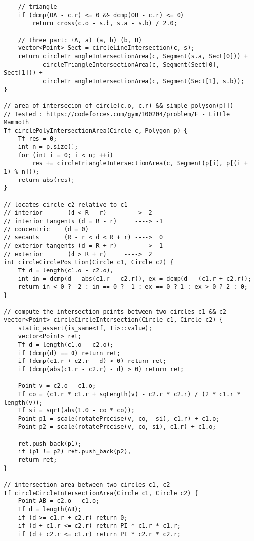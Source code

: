 \documentclass[10pt,a4paper,onesided]{article}
\begin{document}
\begin{multicols*}{3}
\begin{lstlisting}
    // triangle
    if (dcmp(OA - c.r) <= 0 && dcmp(OB - c.r) <= 0)
        return cross(c.o - s.b, s.a - s.b) / 2.0;

    // three part: (A, a) (a, b) (b, B)
    vector<Point> Sect = circleLineIntersection(c, s);
    return circleTriangleIntersectionArea(c, Segment(s.a, Sect[0])) +
           circleTriangleIntersectionArea(c, Segment(Sect[0], Sect[1])) +
           circleTriangleIntersectionArea(c, Segment(Sect[1], s.b));
}

// area of intersecion of circle(c.o, c.r) && simple polyson(p[])
// Tested : https://codeforces.com/gym/100204/problem/F - Little Mammoth
Tf circlePolyIntersectionArea(Circle c, Polygon p) {
    Tf res = 0;
    int n = p.size();
    for (int i = 0; i < n; ++i)
        res += circleTriangleIntersectionArea(c, Segment(p[i], p[(i + 1) % n]));
    return abs(res);
}

// locates circle c2 relative to c1
// interior       (d < R - r)     ----> -2
// interior tangents (d = R - r)     ----> -1
// concentric    (d = 0)
// secants       (R - r < d < R + r) ---->  0
// exterior tangents (d = R + r)     ---->  1
// exterior       (d > R + r)     ---->  2
int circleCirclePosition(Circle c1, Circle c2) {
    Tf d = length(c1.o - c2.o);
    int in = dcmp(d - abs(c1.r - c2.r)), ex = dcmp(d - (c1.r + c2.r));
    return in < 0 ? -2 : in == 0 ? -1 : ex == 0 ? 1 : ex > 0 ? 2 : 0;
}

// compute the intersection points between two circles c1 && c2
vector<Point> circleCircleIntersection(Circle c1, Circle c2) {
    static_assert(is_same<Tf, Ti>::value);
    vector<Point> ret;
    Tf d = length(c1.o - c2.o);
    if (dcmp(d) == 0) return ret;
    if (dcmp(c1.r + c2.r - d) < 0) return ret;
    if (dcmp(abs(c1.r - c2.r) - d) > 0) return ret;

    Point v = c2.o - c1.o;
    Tf co = (c1.r * c1.r + sqLength(v) - c2.r * c2.r) / (2 * c1.r * length(v));
    Tf si = sqrt(abs(1.0 - co * co));
    Point p1 = scale(rotatePrecise(v, co, -si), c1.r) + c1.o;
    Point p2 = scale(rotatePrecise(v, co, si), c1.r) + c1.o;

    ret.push_back(p1);
    if (p1 != p2) ret.push_back(p2);
    return ret;
}

// intersection area between two circles c1, c2
Tf circleCircleIntersectionArea(Circle c1, Circle c2) {
    Point AB = c2.o - c1.o;
    Tf d = length(AB);
    if (d >= c1.r + c2.r) return 0;
    if (d + c1.r <= c2.r) return PI * c1.r * c1.r;
    if (d + c2.r <= c1.r) return PI * c2.r * c2.r;


\end{lstlisting}
\end{multicols*}
\end{document}
